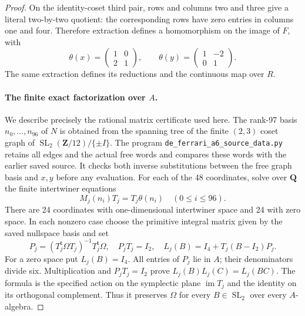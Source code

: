 \begin{proof}
On the identity-coset third pair, rows and columns two
and three give a literal two-by-two quotient:
the corresponding rows have zero entries in columns
one and four. Therefore extraction defines a
homomorphism on the image of $F$, with
\[
 \theta(x)=\begin{pmatrix}1&0\\2&1\end{pmatrix},\qquad
 \theta(y)=\begin{pmatrix}1&-2\\0&1\end{pmatrix}.
 \tag{E.52.12}
\]
The same extraction defines its reductions and the
continuous map over $R$.

\paragraph{The finite exact factorization over $A$.}
We describe precisely the rational matrix certificate
used here. The rank-97 basis $n_0,\ldots,n_{96}$ of
$N$ is obtained from the spanning tree of the finite
$(2,3)$ coset graph of
$\operatorname{SL}_2(\mathbf Z/12)/\{\pm I\}$.
The program \texttt{de\_ferrari\_a6\_source\_data.py}
retains all edges and the actual free words and
compares these words with the earlier saved source.
It checks both inverse substitutions between the
free graph basis and $x,y$ before any evaluation.
For each of the 48 coordinates, solve over $\mathbf Q$
the finite intertwiner equations
\[
             M_j(n_i)T_j=T_j\theta(n_i)
                     \quad(0\leq i\leq96).
 \tag{E.52.13}
\]
There are 24 coordinates with one-dimensional
intertwiner space and 24 with zero space.
In each nonzero case choose the primitive integral
matrix given by the saved nullspace basis and set
\[
 P_j=(T_j^{\mathsf t}\Omega T_j)^{-1}T_j^{\mathsf t}\Omega,
 \quad P_jT_j=I_2,
 \quad L_j(B)=I_4+T_j(B-I_2)P_j.
 \tag{E.52.14}
\]
For a zero space put $L_j(B)=I_4$.
All entries of $P_j$ lie in $A$; their denominators
divide six. Multiplication and $P_jT_j=I_2$ prove
$L_j(B)L_j(C)=L_j(BC)$.
The formula is the specified action on the symplectic
plane $\operatorname{im}T_j$ and the identity on its
orthogonal complement. Thus it preserves $\Omega$
for every $B\in\operatorname{SL}_2$ over every $A$-algebra.


\end{proof}
